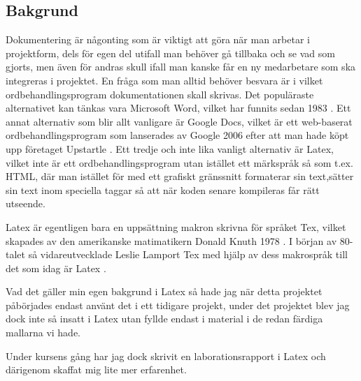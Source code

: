 \subsection{Bakgrund}
Dokumentering är någonting som är viktigt att göra när man arbetar i projektform, dels för egen del utifall man behöver 
gå tillbaka och se vad som gjorts, men även för andras skull ifall man kanske får en ny medarbetare som ska integreras i 
projektet. En fråga som man alltid behöver besvara är i vilket ordbehandlingsprogram dokumentationen skall skrivas. Det populäraste 
alternativet kan tänkas vara Microsoft Word, vilket har funnits sedan 1983 \cite{word_ursprung}.
\newline
Ett annat alternativ som blir allt vanligare är Google Docs, vilket är ett web-baserat ordbehandlingsprogram som lanserades av Google 2006 \cite{docs_launch} efter att man hade köpt upp företaget Upstartle \cite{upstartle}.
\newline
Ett tredje och inte lika vanligt alternativ är Latex, vilket inte är ett ordbehandlingsprogram utan istället ett märkspråk
 så som t.ex. HTML, där man istället för med ett grafiskt gränssnitt formaterar sin text,sätter sin text inom speciella taggar så att när koden senare kompileras får rätt utseende.

Latex är egentligen bara en uppsättning makron skrivna för språket Tex, vilket skapades av den amerikanske matimatikern Donald Knuth 1978 \cite{donald_knuth}. I början av 80-talet så vidareutvecklade Leslie Lamport Tex med hjälp av dess makrospråk till det som 
idag är Latex \cite{leslie_lamport}.

Vad det gäller min egen bakgrund i Latex så hade jag när detta projektet påbörjades endast använt det i ett tidigare projekt, under det projektet
blev jag dock inte så insatt i Latex utan fyllde endast i material i de redan färdiga mallarna vi hade.

Under kursens gång har jag dock skrivit en laborationsrapport i Latex och därigenom skaffat mig lite mer erfarenhet.



